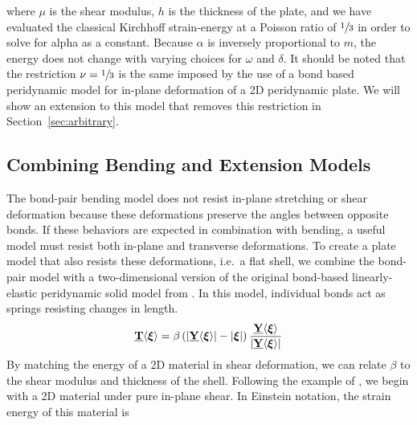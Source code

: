 %
where $\mu$ is the shear modulus, $h$ is the thickness of the plate, and we have evaluated the classical Kirchhoff strain-energy at a Poisson ratio of \(\sfrac{1}{3}\) in order to solve for alpha as a constant.  Because $\alpha$ is inversely proportional to $m$, the energy does not change with varying choices for $\omega$ and $\delta$. It should be noted that the restriction \(\nu=\sfrac{1}{3}\) is the same imposed by the use of a bond based peridynamic model for in-plane deformation of a 2D peridynamic plate. We will show an extension to this model that removes this restriction in Section~\ref{sec:arbitrary}.

\subsection{Combining Bending and Extension Models}
The bond-pair bending model does not resist in-plane stretching or shear deformation because these deformations preserve the angles between opposite bonds.  If these behaviors are expected in combination with bending, a useful model must resist both in-plane and transverse deformations.  To create a plate model that also resists these deformations, i.e.\ a flat shell, we combine the bond-pair model with a two-dimensional version of the original bond-based linearly-elastic peridynamic solid model from \cite{silling2000reformulation}.  In this model, individual bonds act as springs resisting changes in length.
%
\begin{equation}
    \label{eq:bondextension}
    \vstate{T}{}{\boldsymbol{\xi}} =\beta\left(|\vstate{Y}{}{\boldsymbol{\xi}}|-|\boldsymbol{\xi}|\right)\frac{\vstate{Y}{}{\boldsymbol{\xi}}}{|\vstate{Y}{}{\boldsymbol{\xi}}|}
\end{equation}
%
By matching the energy of a 2D material in shear deformation, we can relate \(\beta\) to the shear modulus and thickness of the shell.  Following the example of \cite{silling2007peridynamic}, we begin with a 2D material under pure in-plane shear.  In Einstein notation, the strain energy of this material is
%
